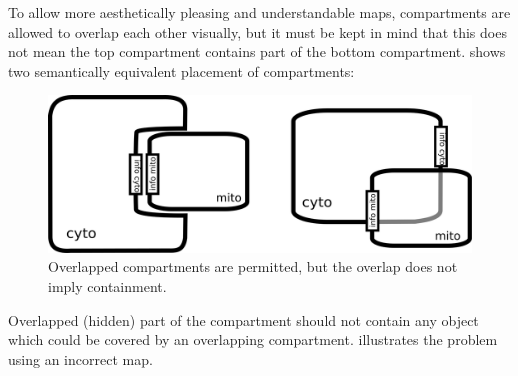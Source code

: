 To allow more aesthetically pleasing and understandable maps, compartments are allowed to overlap each other visually, but it must be kept in mind that this does not mean the top compartment contains part of the bottom compartment.   shows two semantically equivalent placement of compartments:

\begin{figure}[htb]
  \centering
  \includegraphics[scale = 0.4]{examples/compartment_overlapping}
  \caption{Overlapped compartments are permitted, but the overlap does not imply containment.}
  \label{fig:techref:overlap}
\end{figure}

Overlapped (hidden) part of the compartment should not contain any object which could be covered by an overlapping compartment.   illustrates the problem using an incorrect map.

